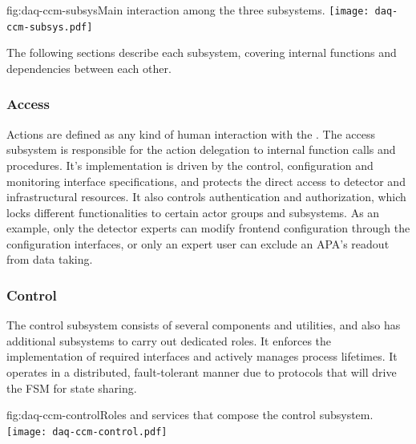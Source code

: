 \begin{dunefigure}{fig:daq-ccm-subsys}{Main interaction among the three  subsystems.}
  \texttt{[image: daq-ccm-subsys.pdf]}
\end{dunefigure}

The following sections describe each  subsystem, covering internal functions and dependencies between each other.

\subsubsection{Access}
\label{sec:daq:design:ccm:access}
Actions are defined as any kind of human interaction with the . The access subsystem is responsible for the action delegation to internal function calls and procedures. It's implementation is driven by the control, configuration and monitoring interface specifications, and protects the direct access to detector and infrastructural resources. It also controls authentication and authorization, which locks different functionalities to certain actor groups and subsystems. As an example, only the detector experts can modify frontend configuration through the configuration interfaces, or only an expert user can exclude an APA's readout from data taking. 


\subsubsection{Control}
\label{sec:daq:design:ccm:control}

The control subsystem consists of several components and utilities, and also has additional subsystems to carry out dedicated roles. It enforces the implementation of required interfaces and actively manages  process lifetimes. It operates in a distributed, fault-tolerant manner due to protocols that will drive the FSM for state sharing. 

\begin{dunefigure}{fig:daq-ccm-control}{Roles and services that compose the  control subsystem.}
  \texttt{[image: daq-ccm-control.pdf]}
\end{dunefigure}

